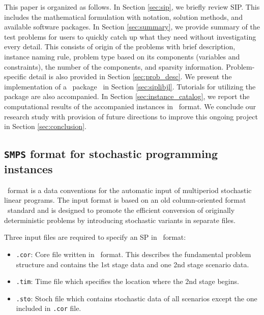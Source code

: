 
This paper is organized as follows. In Section \ref{sec:sip}, we briefly review SIP. This includes the mathematical formulation with notation, solution methods, and available software packages. In Section \ref{sec:summary}, we provide summary of the test problems for users to quickly catch up what they need without investigating every detail. This consists of origin of the problems with brief description, instance naming rule, problem type based on its components (variables and constraints), the number of the components, and sparsity information. Problem-specific detail is also provided in Section \ref{sec:prob_desc}. We present the implementation of a \julia\ package \siplibjl\ in Section \ref{sec:siplibjl}. Tutorials for utilizing the package are also accompanied. In Section \ref{sec:instance_catalog}, we report the computational results of the accompanied instances in \smps\ format. We conclude our research study with provision of future directions to improve this ongoing project in Section \ref{sec:conclusion}. 



\subsection{\texttt{SMPS} format for stochastic programming instances} \label{subsec:smps}
\smps\ format \cite{SMPS} is a data conventions for the automatic input of multiperiod stochastic linear programs. The input format is based on an old column-oriented format \mpsx\ standard and is designed to promote the efficient conversion of originally deterministic problems by introducing stochastic variants in separate files. 

Three input files are required to specify an SP in \smps\ format:
\begin{itemize}
	\item \texttt{.cor}: Core file written in \mps\ format. This describes the fundamental problem structure and contains the 1st stage data and one 2nd stage scenario data.
	\item \texttt{.tim}: Time file which specifies the location where the 2nd stage begins.
	\item \texttt{.sto}: Stoch file which contains stochastic data of all scenarios except the one included in \texttt{.cor} file.
\end{itemize}



